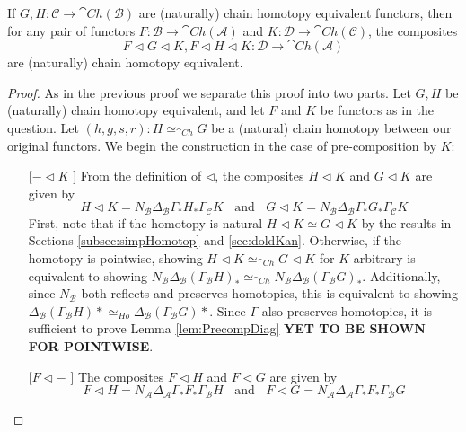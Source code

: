 \begin{lem}[label=lem:3.4NewComp]
    If $G,H:\mathcal{C}\rightarrow \cat{Ch}(\mathcal{B})$ are (naturally) chain homotopy equivalent functors, then for any pair of functors $F:\mathcal{B}\rightarrow \cat{Ch}(\mathcal{A})$ and $K:\mathcal{D}\rightarrow \cat{Ch}(\mathcal{C})$, the composites
    \begin{equation*}
        F\lhd G\lhd K,F\lhd H\lhd K:\mathcal{D}\rightarrow \cat{Ch}(\mathcal{A})
    \end{equation*}
    are (naturally) chain homotopy equivalent.
\end{lem}
\begin{proof}
    As in the previous proof we separate this proof into two parts. Let $G,H$ be (naturally) chain homotopy equivalent, and let $F$ and $K$ be functors as in the question. Let $(h,g,s,r):H\simeq_{\cat{Ch}}G$ be a (natural) chain homotopy between our original functors. We begin the construction in the case of pre-composition by $K$:
    \begin{itemize}
        \setlength{\itemindent}{2em}
        \item[[$-\lhd K$]] From the definition of $\lhd$, the composites $H\lhd K$ and $G\lhd K$ are given by
        \begin{equation*}
            H\lhd K = N_\mathcal{B}\Delta_\mathcal{B}\Gamma_*H_*\Gamma_\mathcal{C}K\;\;\text{ and }\;\;G\lhd K = N_\mathcal{B}\Delta_\mathcal{B}\Gamma_*G_*\Gamma_\mathcal{C}K
        \end{equation*}
        First, note that if the homotopy is natural $H\lhd K\simeq G\lhd K$ by the results in Sections \ref{subsec:simpHomotop} and \ref{sec:doldKan}. Otherwise, if the homotopy is pointwise, showing $H\lhd K\simeq_{\cat{Ch}}G\lhd K$ for $K$ arbitrary is equivalent to showing $N_\mathcal{B}\Delta_\mathcal{B}(\Gamma_\mathcal{B}H)_* \simeq_{\cat{Ch}}N_\mathcal{B}\Delta_\mathcal{B}(\Gamma_\mathcal{B}G)_*$. Additionally, since $N_\mathcal{B}$ both reflects and preserves homotopies, this is equivalent to showing $\Delta_\mathcal{B}(\Gamma_\mathcal{B}H)*\simeq_{Ho}\Delta_\mathcal{B}(\Gamma_\mathcal{B}G)*$. Since $\Gamma$ also preserves homotopies, it is sufficient to prove Lemma \ref{lem:PrecompDiag} \textbf{YET TO BE SHOWN FOR POINTWISE}.
        \item[[$F\lhd -$]] The composites $F \lhd H$ and $F\lhd G$ are given by
        \begin{equation*}
            F\lhd H = N_\mathcal{A}\Delta_\mathcal{A}\Gamma_*F_*\Gamma_\mathcal{B}H\;\;\text{ and }\;\;F\lhd G = N_\mathcal{A}\Delta_\mathcal{A}\Gamma_*F_*\Gamma_\mathcal{B}G

\end{equation*}
\end{itemize}
\end{proof}
